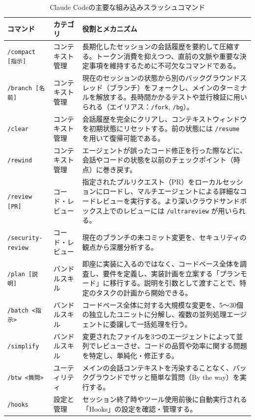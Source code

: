 \documentclass[a4paper,11pt]{ltjsarticle}
\newcommand{\cmd}[1]{\texttt{#1}}
\begin{document}
\begin{table}[htbp]
\centering
\caption{Claude Codeの主要な組み込みスラッシュコマンド}
\label{tab:claude}
\small
\begin{tabularx}{\textwidth}{P{30mm}P{24mm}L}
\toprule
コマンド & カテゴリ & 役割とメカニズム \\
\midrule
\cmd{/compact [指示]} & コンテキスト管理 & 長期化したセッションの会話履歴を要約して圧縮する。トークン消費を抑えつつ、直前の文脈や重要な決定事項を維持するために不可欠なコマンドである\cite{r9}。 \\
\cmd{/branch [名前]} & コンテキスト管理 & 現在のセッションの状態から別のバックグラウンドスレッド（ブランチ）をフォークし、メインのターミナルを解放する。長時間かかるテストや並行検証に用いられる（エイリアス：\cmd{/fork}, \cmd{/bg}）\cite{r9}。 \\
\cmd{/clear} & コンテキスト管理 & 会話履歴を完全にクリアし、コンテキストウィンドウを初期状態にリセットする。前の状態には \cmd{/resume} を用いて復帰可能である\cite{r6}。 \\
\cmd{/rewind} & コンテキスト管理 & エージェントが誤ったコード修正を行った際などに、会話やコードの状態を以前のチェックポイント（時点）に巻き戻す\cite{r9}。 \\
\cmd{/review [PR]} & コード・レビュー & 指定されたプルリクエスト（PR）をローカルセッションにロードし、マルチエージェントによる詳細なコードレビューを実行する。より深いクラウドサンドボックス上でのレビューには \cmd{/ultrareview} が用いられる\cite{r9}。 \\
\cmd{/security-review} & コード・レビュー & 現在のブランチの未コミット変更を、セキュリティの観点から深層分析する\cite{r9}。 \\
\cmd{/plan [説明]} & バンドルスキル & 即座に実装に入るのではなく、コードベース全体を調査し、要件を定義し、実装計画を立案する「プランモード」に移行する。説明を引数として渡すことで、特定のタスクの計画から開始できる\cite{r9}。 \\
\cmd{/batch <指示>} & バンドルスキル & コードベース全体に対する大規模な変更を、5〜30個の独立したユニットに分解し、複数の並列処理エージェントに委譲して一括処理を行う\cite{r9}。 \\
\cmd{/simplify} & バンドルスキル & 変更されたファイルを3つのエージェントによって並列でレビューさせ、コードの品質や効率に関する問題を特定し、単純化・修正する\cite{r9}。 \\
\cmd{/btw <質問>} & ユーティリティ & メインの会話コンテキストを汚染することなく、バックグラウンドでサッと簡単な質問（By the way）を実行する\cite{r8}。 \\
\cmd{/hooks} & 設定と管理 & セッション終了時やツール使用前後に自動実行される「Hooks」の設定を確認・管理する\cite{r9}。 \\
\bottomrule
\end{tabularx}
\end{table}
\end{document}

